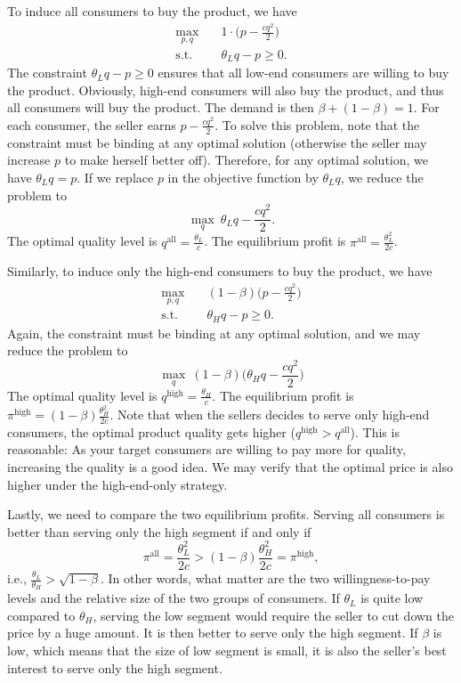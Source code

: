 \documentclass[12pt,a4paper]{article}
\begin{document}
To induce all consumers to buy the product, we have 
\[\begin{split}
	\max_{p, q} \quad & 1 \cdot \bigg(p - \frac{cq^2}{2}\bigg) \\
	\mbox{s.t.} \quad & \theta_L q - p \geq 0.
\end{split}\]
The constraint $\theta_L q - p \geq 0$ ensures that all low-end consumers 
are willing to buy the product. Obviously, high-end consumers will also 
buy the product, and thus all consumers will buy the product. 
The demand is then $\beta + (1 - \beta) = 1$. 
For each consumer, the seller earns $p - \frac{cq^2}{2}$. 
To solve this problem, note that the constraint must be binding at 
any optimal solution (otherwise the seller may increase $p$ to make herself better
off). Therefore, for any optimal solution, we have $\theta_L q = p$. 
If we replace $p$ in the objective function by $\theta_L q$, 
we reduce the problem to 
\[
	\max_q \ \theta_L q - \frac{cq^2}{2}. 
\]
The optimal quality level is $q^{\mathrm{all}} = \frac{\theta_L}{c}$. The equilibrium 
profit is $\pi^{\mathrm{all}} = \frac{\theta_L^2}{2c}$. 

Similarly, to induce only the high-end consumers to buy the product, we have 
\[\begin{split}
	\max_{p, q} \quad & (1 - \beta) \bigg(p - \frac{cq^2}{2}\bigg) \\
	\mbox{s.t.} \quad & \theta_H q - p \geq 0.
\end{split}\]
Again, the constraint must be binding at 
any optimal solution, and we may reduce the problem to 
\[
	\max_q \ (1 - \beta) \bigg(\theta_H q - \frac{cq^2}{2}\bigg)
\]
The optimal quality level is $q^{\mathrm{high}} = \frac{\theta_H}{c}$. The equilibrium 
profit is $\pi^{\mathrm{high}} = (1 - \beta)\frac{\theta_H^2}{2c}$. 
Note that when the sellers decides to serve only high-end consumers, 
the optimal product quality gets higher ($q^{\mathrm{high}} > q^{\mathrm{all}}$). 
This is reasonable: As your target consumers are willing to pay more for quality, 
increasing the quality is a good idea. We may verify that the optimal price
is also higher under the high-end-only strategy. 

Lastly, we need to compare the two equilibrium profits. 
Serving all consumers is better than serving only the high segment 
if and only if 
\[
	\pi^{\mathrm{all}} = \frac{\theta_L^2}{2c} 
	> (1 - \beta) \frac{\theta_H^2}{2c} = \pi^{\mathrm{high}}, 
\]
i.e., $\frac{\theta_L}{\theta_H} > \sqrt{1 - \beta}$. 
In other words, what matter are the two willingness-to-pay levels and 
the relative size of the two groups of consumers. If $\theta_L$ is quite low
compared to $\theta_H$, serving the low segment would require the seller
to cut down the price by a huge amount. It is then better to serve only 
the high segment. If $\beta$ is low, which means that 
the size of low segment is small, it is also the seller's best interest to 
serve only the high segment. 
\end{document}
